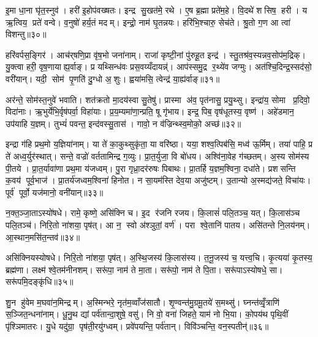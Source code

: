 इ॒मा धा॒ना घृ॑त॒स्नुव॑। हरी॑ इ॒होप॑वख्षतः। इन्द्र सु॒खत॑मे॒ रथे। ए॒ष ब्र॒ह्मा प्रते॑म॒हे। वि॒दथे॑ शसिष॒ हरी। य ऋ॒त्विय॒ प्रते॑ वन्वे। व॒नुषो॑ हर्य॒तं मदम्। इन्द्रो॒ नाम॑ घृ॒तन्नयः। हरि॑भि॒श्चारु॒ सेच॑ते। श्रु॒तो ग॒ण आ त्वा॑ विशन्तु॥३०॥

हरि॑वर्पस॒ङ्गिर॑। आच॑र्‌षणि॒प्रा वृ॑ष॒भो जना॑नाम्। राजा॑ कृष्टी॒नां पु॑रुहू॒त इन्द्र॑। स्तु॒तश्र॑व॒स्यन्नव॒सोप॑म॒द्रिक्। यु॒क्त्वा हरी॒ वृष॒णायाह्य॒र्वाङ्। प्र यथ्सिन्ध॑वः प्रस॒वय्यँदायन्न्॑। आप॑स्समु॒द्र र॒थ्ये॑व जग्मुः। अत॑श्चि॒दिन्द्र॒स्सद॑सो॒ वरी॑यान्। यदी॒ सोम॑ पृ॒णति॑ दु॒ग्धो अ॒शुः। ह्वया॑मसि॒ त्वेन्द्र॑ या॒ह्य॑र्वाङ्॥३१॥

अर॑न्ते॒ सोम॑स्त॒नुवे॑ भवाति। शत॑क्रतो मा॒दय॑स्वा सु॒तेषु॑। प्रास्मा अ॑व॒ पृत॑नासु॒ प्रयु॒थ्सु। इन्द्रा॑य॒ सोमा प्र॒दिवो॒ विदा॑नाः। ऋ॒भुर्येभि॒र्वृष॑पर्वा॒ विहा॑याः। प्र॒य॒म्यमा॑णा॒न्प्रति॒ षू गृ॑भाय। इन्द्र॒ पिब॒ वृष॑धूतस्य॒ वृष्ण॑। अहे॑डमान॒ उप॑याहि य॒ज्ञम्। तुभ्यं॑ पवन्त॒ इन्द॑वस्सु॒तास॑। गावो॒ न व॑ज्रिन्थ्स्व॒मोको॒ अच्छ॑॥३२॥

इन्द्रा ग॑हि प्रथ॒मो य॒ज्ञिया॑नाम्। या ते॑ का॒कुथ्सुकृ॑ता॒ या वरि॑ष्ठा। यया॒ शश्व॒त्पिब॑सि॒ मध्व॑ ऊ॒र्मिम्। तया॑ पाहि॒ प्र ते॑ अध्व॒र्युर॑स्थात्। सन्ते॒ वज्रो॑ वर्ततामिन्द्र ग॒व्युः। प्रा॒त॒र्युजा॒ वि बो॑धय। अश्वि॑ना॒वेह ग॑च्छतम्। अ॒स्य सोम॑स्य पी॒तये। प्रा॒त॒र्यावा॑णा प्रथ॒मा य॑जध्वम्। पु॒रा गृध्रा॒दर॑रुषः पिबाथः। प्रा॒तर्\mbox{}हि य॒ज्ञम॒श्विना॒ दधा॑ते। प्रशसन्ति क॒वय॑ पूर्व॒भाज॑। प्रा॒तर्य॑जध्वम॒श्विना॑ हिनोत। न सा॒यम॑स्ति देव॒या अजु॑ष्टम्। उ॒तान्यो अ॒स्मद्य॑जते॒ विचा॑यः। पूर्व॑ पूर्वो॒ यज॑मानो॒ वनी॑यान्॥३३॥\anuvakamend[चा॒श्व॒जिद्यो ग॑च्छतन्नो॒ दाश॒न्नामा॑भि॒श्रीर्ग॑मेम स॒प्रथा॑ भजामहे विशन्तु या॒ह्य॑र्वाङच्छ॑ पिबाथ॒ष्षट्च॑]

न॒क्त॒ञ्जा॒ताऽस्यो॑षधे। रामे॒ कृष्णे॒ असि॑क्नि च। इ॒द र॑जनि रजय। कि॒लासं॑ पलि॒तञ्च॒ यत्। कि॒लास॑ञ्च पलि॒तञ्च॑। निरि॒तो ना॑शया॒ पृष॑त्। आ न॒ स्वो अ॑श्ञुतां॒ वर्ण॑। परा श्वे॒तानि॑ पातय। असि॑तन्ते नि॒लय॑नम्। आ॒स्थान॒मसि॑त॒न्तव॑॥३४॥

असि॑क्नियस्योषधे। निरि॒तो ना॑शया॒ पृष॑त्। अ॒स्थि॒जस्य॑ कि॒लास॑स्य। त॒नू॒जस्य॑ च॒ यत्त्व॒चि। कृ॒त्यया॑ कृ॒तस्य॒ ब्रह्म॑णा। लक्ष्म॑ श्वे॒तम॑नीनशम्। सरू॑पा॒ नाम॑ ते मा॒ता। सरू॑पो॒ नाम॑ ते पि॒ता। सरू॑पाऽस्योषधे॒ सा। सरू॑पमि॒दङ्कृ॑धि॥३५॥

शु॒न हु॑वेम म॒घवा॑न॒मिन्द्रम्। अ॒स्मिन्भरे॒ नृत॑म॒व्वाँज॑सातौ। शृ॒ण्वन्त॑मु॒ग्रमू॒तये॑ स॒मथ्सु॑। घ्नन्त॑व्वृँ॒त्राणि॑ स॒ञ्जित॒न्धना॑नाम्। धू॒नु॒थ द्यां पर्व॑तान्दा॒शुषे॒ वसु॑। नि वो॒ वना॑ जिहते॒ याम॑ नो भि॒या। को॒पय॑थ पृथि॒वीं पृ॑श्ञिमातरः। यु॒धे यदु॑ग्रा॒ पृष॑ती॒रयु॑ग्ध्वम्। प्रवे॑पयन्ति॒ पर्व॑तान्। विवि॑ञ्चन्ति॒ वन॒स्पतीन्॑॥३६॥

